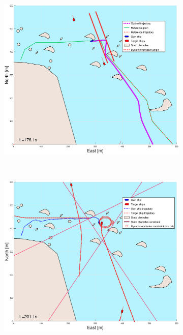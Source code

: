 \begin{figure}[ht]
\begin{subfigure}[b]{0.494\textwidth}
        \subcaption{}
    \end{subfigure}
    \hfill
    \begin{subfigure}[b]{0.494\textwidth}
        \centering
        \includegraphics[width=\textwidth]{Images/Figures/skjergard_m_trafikk_NEW/_Simple_1fig999_time=176}
        \subcaption{}
    \end{subfigure}
    \hfill
    \\
    \begin{subfigure}[b]{0.494\textwidth}
        \centering
        \includegraphics[width=\textwidth]{Images/Figures/skjergard_m_trafikk_NEW/_Simple_1fig1_time=201}

\end{subfigure}
\end{figure}
